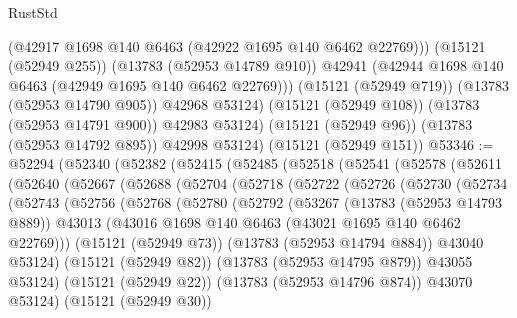 \begin{lexlean}{RustStd}
\begin{coremodule}
              (@42917 @1698 @140 @6463 (@42922 @1695 @140 @6462 @22769)))
            (@15121 (@52949 @255))
            (@13783 (@52953 @14789 @910))
            @42941
            (@42944 @1698 @140 @6463 (@42949 @1695 @140 @6462 @22769)))
          (@15121 (@52949 @719))
          (@13783 (@52953 @14790 @905))
          @42968
          @53124)
        (@15121 (@52949 @108))
        (@13783 (@52953 @14791 @900))
        @42983
        @53124)
      (@15121 (@52949 @96))
      (@13783 (@52953 @14792 @895))
      @42998
      @53124)
    (@15121 (@52949 @151))
@53346 := @52294
    (@52340
      (@52382
        (@52415
          (@52485
            (@52518
              (@52541
                (@52578
                  (@52611
                    (@52640
                      (@52667
                        (@52688
                          (@52704
                            (@52718
                              (@52722
                                (@52726
                                  (@52730
                                    (@52734
                                      (@52743
                                        (@52756
                                          (@52768
                                            (@52780
                                              (@52792
                                                (@53267
                                                  (@13783 (@52953 @14793 @889))
                                                  @43013
                                                  (@43016
                                                    @1698
                                                    @140
                                                    @6463
                                                    (@43021 @1695 @140 @6462 @22769)))
                                                (@15121 (@52949 @73))
                                                (@13783 (@52953 @14794 @884))
                                                @43040
                                                @53124)
                                              (@15121 (@52949 @82))
                                              (@13783 (@52953 @14795 @879))
                                              @43055
                                              @53124)
                                            (@15121 (@52949 @22))
                                            (@13783 (@52953 @14796 @874))
                                            @43070
                                            @53124)
                                          (@15121 (@52949 @30))

\end{coremodule}
\end{lexlean}
